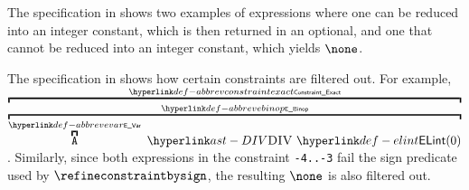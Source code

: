 
The specification in  shows two examples of expressions
where one can be reduced into an integer constant, which is then returned in an optional,
and one that cannot be reduced into an integer constant, which yields $\none$.




The specification in 
shows how certain constraints are filtered out.
For example, $\AbbrevConstraintExact{\AbbrevEBinop{\DIV}{\AbbrevEVar{\vA}}{\ELInt{0}}}$.
Similarly, since both expressions in the constraint \verb|-4..-3| fail the sign predicate
used by $\refineconstraintbysign$, the resulting $\none$ is also filtered out.

